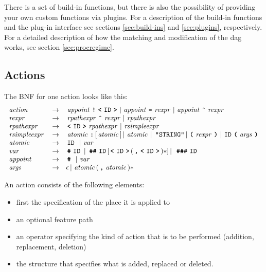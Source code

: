 \documentclass[11pt,a4paper]{article}
\begin{document}
There is a set of build-in functions, but there is also the possibility of
providing your own custom functions via plugins. For a description of the
build-in functions and the plug-in interface see sections \ref{sec:build-ins}
and \ref{sec:plugins}, respectively. For a detailed description of how the
matching and modification of the dag works, see section \ref{sec:procregime}.

\subsection{Actions}

The BNF for one action looks like this:
\[
\begin{array}{lcl}
\nt{action} & \rightarrow & \nt{appoint} \tok{!} \tok{<}\id \tok{>} \BAR
\nt{appoint} \tok{=} \nt{rexpr} \BAR  \nt{appoint} \tok{\^{}} \nt{rexpr}\\
\nt{rexpr} & \rightarrow &
  \nt{rpathexpr} \tok{\^{}} \nt{rexpr} \BAR
  \nt{rpathexpr}\\
\nt{rpathexpr} & \rightarrow &
  \tok{<}\id \tok{>} \nt{rpathexpr} \BAR
  \nt{rsimpleexpr}\\
\nt{rsimpleexpr} & \rightarrow &
  \nt{atomic} \tok{:} [ \nt{atomic} ] \BAR
  \nt{atomic} \BAR \ \verb$"STRING"$  \BAR
  \tok{(} \nt{rexpr} \tok{)} \BAR
  \id\tok{(}\nt{args}\tok{)}\\
\nt{atomic} & \rightarrow & \id \ \BAR \nt{var}\\
\nt{var} & \rightarrow &
  \tok{\#}\id \ \mbox{\textbar}
  \ \tok{\#\#}\id [ \tok{<}\id \tok{>} ( \tok{,} \tok{<}\id \tok{>} )* ] \BAR
  \ \tok{\#\#\#}\id \\
\nt{appoint} & \rightarrow & \tok{\#}  \ \BAR \nt{var}\\
\nt{args} & \rightarrow & \epsilon
  \BAR \nt{atomic} (\tok{,} \nt{atomic})*
\end{array}
\]

An action consists of the following elements:
\begin{itemize}
\item first the specification of the place it is applied to
\item an optional feature path
\item an operator specifying the kind of action that is
  to be performed (addition, replacement, deletion)
\item the structure that specifies what is added, replaced or deleted.
\end{itemize}
\end{document}
